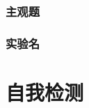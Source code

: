 \documentclass[color=orange,openany]{textbook-cn}
\begin{document}
\lipsum[1-6]
\begin{Improve}
\begin{QsNum}
\item \lipsum[1][1-4]
\item \lipsum[1][1-4]
\item \lipsum[1][1-4]
\item \lipsum[1][1-4]
\item \lipsum[1][1-4]
\item \lipsum[1][1-4]
\item \lipsum[1][1-4]
\item \lipsum[1][1-4]
\end{QsNum}
\begin{QsNum}
\item \lipsum[1][1-4]
\item \lipsum[1][1-4]
\item \lipsum[1][1-4]
\item \lipsum[1][1-4]
\item \lipsum[1][1-4]
\item \lipsum[1][1-4]
\item \lipsum[1][1-4]
\item \lipsum[1][1-4]
\end{QsNum}
\tcblower
\lipsum[1]
\end{Improve}





\begin{Quiz}
\section{主观题}
\end{Quiz}



\begin{Project}
\section{实验名}

\begin{Theorem*}[定理名称]
\lipsum[1][1-3]
\end{Theorem*}
\end{Project}


\part*{自我检测}
\end{document}
